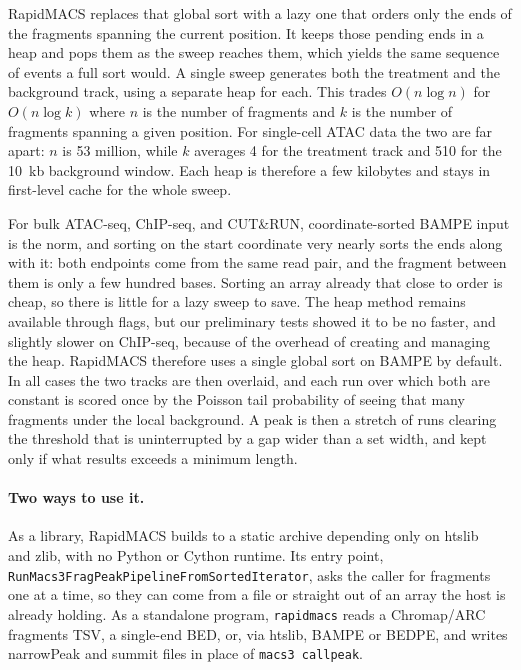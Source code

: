 \documentclass[namedate,webpdf,contemporary,large]{oup-authoring-template}
\begin{document}
RapidMACS replaces that global sort with a lazy one that orders only the ends of the fragments spanning the current position. It keeps those pending ends in a heap and pops them as the sweep reaches them, which yields the same sequence of events a full sort would. A single sweep generates both the treatment and the background track, using a separate heap for each. This trades $O(n \log n)$ for $O(n \log k)$ where $n$ is the number of fragments and $k$ is the number of fragments spanning a given position.  For single-cell ATAC data the two are far apart: $n$ is 53 million, while $k$ averages 4 for the treatment track and 510 for the 10~kb background window. Each heap is therefore a few kilobytes and stays in first-level cache for the whole sweep.

For bulk ATAC-seq, ChIP-seq, and CUT\&RUN, coordinate-sorted BAMPE input is the norm, and sorting on the start coordinate very nearly sorts the ends along with it: both endpoints come from the same read pair, and the fragment between them is only a few hundred bases. Sorting an array already that close to order is cheap, so there is little for a lazy sweep to save. The heap method remains available through flags, but our preliminary tests showed it to be no faster, and slightly slower on ChIP-seq, because of the overhead of creating and managing the heap. RapidMACS therefore uses a single global sort on BAMPE by default. In all cases the two tracks are then overlaid, and each run over which both are constant is scored once by the Poisson tail probability of seeing that many fragments under the local background. A peak is then a stretch of runs clearing the threshold that is uninterrupted by a gap wider than a set width, and kept only if what results exceeds a minimum length.

\paragraph{Two ways to use it.}
As a library, RapidMACS builds to a static archive depending only on htslib~\citep{htslib} and zlib, with no Python or Cython runtime. Its entry point, \texttt{RunMacs3\allowbreak Frag\allowbreak Peak\allowbreak Pipeline\allowbreak From\allowbreak Sorted\allowbreak Iterator}, asks the caller for fragments one at a time, so they can come from a file or straight out of an array the host is already holding. As a standalone program, \texttt{rapidmacs} reads a Chromap/ARC fragments TSV, a single-end BED, or, via htslib, BAMPE or BEDPE, and writes narrowPeak and summit files in place of \texttt{macs3 callpeak}.
\end{document}
